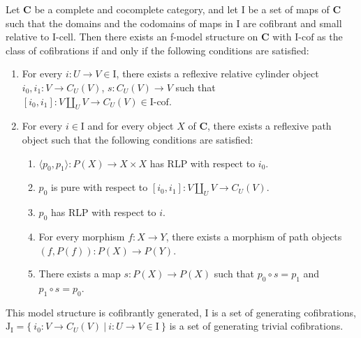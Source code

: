 \documentclass{amsart}
\theoremstyle{definition}
\newcommand{\cat}[1]{\mathbf{#1}}
\newcommand{\C}{\cat{C}}
\newcommand{\I}{\mathrm{I}}
\newcommand{\J}{\mathrm{J}}
\newcommand{\class}[2]{#1\text{-}\mathrm{#2}}
\newcommand{\Icell}[1][\I]{\class{#1}{cell}}
\newcommand{\Icof}[1][\I]{\class{#1}{cof}}
\newcommand{\cyli}{i}
\begin{document}
\begin{thm}
Let $\C$ be a complete and cocomplete category, and let $\I$ be a set of maps of $\C$
such that the domains and the codomains of maps in $\I$ are cofibrant and small relative to $\Icell$.
Then there exists an f-model structure on $\C$ with $\Icof$ as the class of cofibrations if and only if the following conditions are satisfied:
\begin{enumerate}
\item For every $i : U \to V \in \I$, there exists a reflexive relative cylinder object $\cyli_0,\cyli_1 : V \to C_U(V)$, $s : C_U(V) \to V$
such that $[\cyli_0,\cyli_1] : V \amalg_U V \to C_U(V) \in \Icof$.
\item For every $i \in \I$ and for every object $X$ of $\C$, there exists a reflexive path object such that the following conditions are satisfied:
\begin{enumerate}
\item $\langle p_0, p_1 \rangle : P(X) \to X \times X$ has RLP with respect to $\cyli_0$.
\item $p_0$ is pure with respect to $[\cyli_0,\cyli_1] : V \amalg_U V \to C_U(V)$.
\item $p_0$ has RLP with respect to $i$.
\item For every morphism $f : X \to Y$, there exists a morphism of path objects $(f,P(f)) : P(X) \to P(Y)$.
\item There exists a map $s : P(X) \to P(X)$ such that $p_0 \circ s = p_1$ and $p_1 \circ s = p_0$.
\end{enumerate}
\end{enumerate}
This model structure is cofibrantly generated, $\I$ is a set of generating cofibrations,
$\J_\I = \{\ \cyli_0 : V \to C_U(V)\ |\ i : U \to V \in \I \ \}$ is a set of generating trivial cofibrations.
\end{thm}
\end{document}
